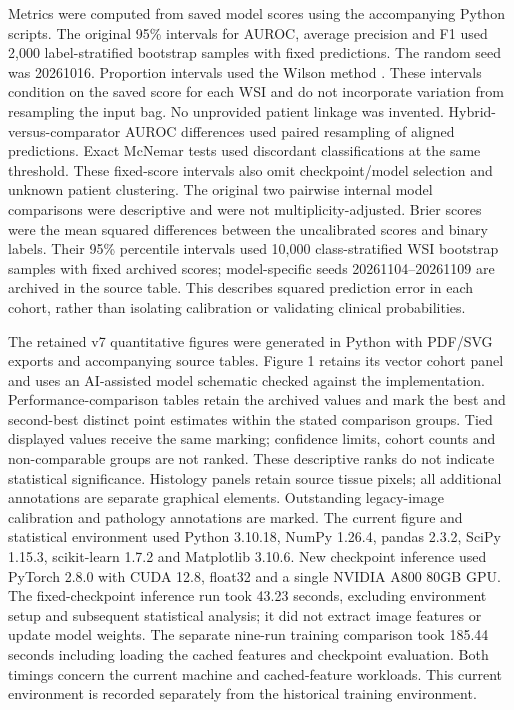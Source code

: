 Metrics were computed from saved model scores using the accompanying Python scripts. The original 95\% intervals for AUROC, average precision and F1 used 2,000 label-stratified bootstrap samples with fixed predictions. The random seed was 20261016. Proportion intervals used the Wilson method \citep{ref19}. These intervals condition on the saved score for each WSI and do not incorporate variation from resampling the input bag. No unprovided patient linkage was invented. Hybrid-versus-comparator AUROC differences used paired resampling of aligned predictions. Exact McNemar tests used discordant classifications at the same threshold. These fixed-score intervals also omit checkpoint/model selection and unknown patient clustering. The original two pairwise internal model comparisons were descriptive and were not multiplicity-adjusted. Brier scores were the mean squared differences between the uncalibrated scores and binary labels. Their 95\% percentile intervals used 10,000 class-stratified WSI bootstrap samples with fixed archived scores; model-specific seeds 20261104--20261109 are archived in the source table. This describes squared prediction error in each cohort, rather than isolating calibration or validating clinical probabilities.

The retained v7 quantitative figures were generated in Python with PDF/SVG exports and accompanying source tables. Figure 1 retains its vector cohort panel and uses an AI-assisted model schematic checked against the implementation. Performance-comparison tables retain the archived values and mark the best and second-best distinct point estimates within the stated comparison groups. Tied displayed values receive the same marking; confidence limits, cohort counts and non-comparable groups are not ranked. These descriptive ranks do not indicate statistical significance. Histology panels retain source tissue pixels; all additional annotations are separate graphical elements. Outstanding legacy-image calibration and pathology annotations are marked. The current figure and statistical environment used Python 3.10.18, NumPy 1.26.4, pandas 2.3.2, SciPy 1.15.3, scikit-learn 1.7.2 and Matplotlib 3.10.6. New checkpoint inference used PyTorch 2.8.0 with CUDA 12.8, float32 and a single NVIDIA A800 80GB GPU. The fixed-checkpoint inference run took 43.23 seconds, excluding environment setup and subsequent statistical analysis; it did not extract image features or update model weights. The separate nine-run training comparison took 185.44 seconds including loading the cached features and checkpoint evaluation. Both timings concern the current machine and cached-feature workloads. This current environment is recorded separately from the historical training environment.

